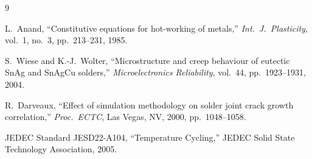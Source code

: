 \documentclass[11pt,a4paper]{article}
\begin{document}
\begin{thebibliography}{9}

  L.~Anand,
  ``Constitutive equations for hot-working of metals,''
  \textit{Int.\ J.\ Plasticity}, vol.~1, no.~3, pp.~213--231, 1985.

  S.~Wiese and K.-J.~Wolter,
  ``Microstructure and creep behaviour of eutectic SnAg and SnAgCu solders,''
  \textit{Microelectronics Reliability}, vol.~44, pp.~1923--1931, 2004.

  R.~Darveaux,
  ``Effect of simulation methodology on solder joint crack growth correlation,''
  \textit{Proc.\ ECTC}, Las Vegas, NV, 2000, pp.~1048--1058.

  JEDEC Standard JESD22-A104,
  ``Temperature Cycling,''
  JEDEC Solid State Technology Association, 2005.

\end{thebibliography}
\end{document}
